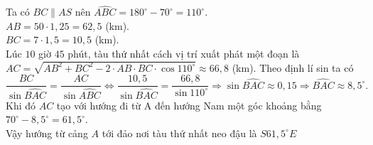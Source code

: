 \begin{ex}
{\begin{itemchoice}
		\itemch
		Ta có $BC\parallel AS$ nên $\widehat{ABC}=180^\circ-70^\circ=110^\circ$.\\
		$AB=50\cdot 1{,}25=62{,}5$ (km).\\
		$BC=7\cdot 1{,}5=10{,}5$ (km).\\
		Lúc $10$ giờ $45$ phút, tàu thứ nhất cách vị trí xuất phát một đoạn là\\
		$AC=\sqrt{AB^2+BC^2-2\cdot AB\cdot BC\cdot \cos 110^\circ}\approx 66{,}8$ (km).
		\itemch Theo định lí sin ta có
		$$\dfrac{BC}{\sin\widehat{BAC}}=\dfrac{AC}{\sin\widehat{ABC}}\Leftrightarrow \dfrac{10{,}5}{\sin\widehat{BAC}}=\dfrac{66{,}8}{\sin 110^\circ}\Rightarrow \sin\widehat{BAC}\approx 0{,}15\Rightarrow \widehat{BAC}\approx 8{,}5^\circ.$$
		Khi đó $AC$ tạo với hướng đi từ A đến hướng Nam một góc khoảng bằng $70^\circ-8{,}5^\circ=61{,}5^\circ$.\\
		Vậy hướng từ cảng $A$ tới đảo nơi tàu thứ nhất neo đậu là $S 61{,}5^{\circ} E$
	\end{itemchoice}
	}
\end{ex}
